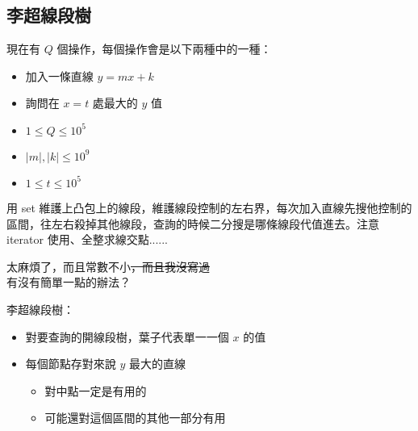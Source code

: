 \subsection{李超線段樹}

\begin{frame}{\ectitle}
    \begin{problem}[動態凸包]
        現在有 $Q$ 個操作，每個操作會是以下兩種中的一種：

        \begin{itemize}
            \item 加入一條直線 $y = mx + k$
            \item 詢問在 $x = t$ 處最大的 $y$ 值
        \end{itemize}

        \begin{itemize}
            \item $1\le Q \le 10^5$
            \item $|m|, |k| \le 10^9$
            \item $1 \le t \le 10^5$
        \end{itemize}
    \end{problem}
\end{frame}

\begin{frame}{\ectitle}
    用 set 維護上凸包上的線段，維護線段控制的左右界，每次加入直線先搜他控制的區間，往左右殺掉其他線段，查詢的時候二分搜是哪條線段代值進去。注意 iterator 使用、全整求線交點......

    太麻煩了，而且常數不小\sout{，而且我沒寫過} \\
    有沒有簡單一點的辦法？
\end{frame}

\begin{frame}{\ectitle}
    李超線段樹：
    \begin{itemize}
        \item 對要查詢的開線段樹，葉子代表單一一個 $x$ 的值
        \item 每個節點存對來說 $y$ 最大的直線
        \begin{itemize}
            \item 對中點一定是有用的
            \item 可能還對這個區間的其他一部分有用
        \end{itemize}
    \end{itemize}
\end{frame}

